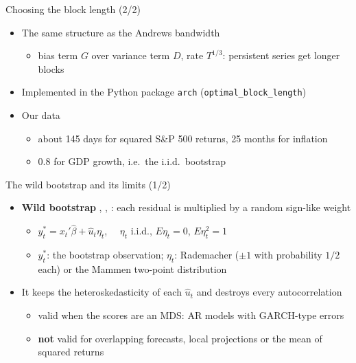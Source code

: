 \begin{frame}{Choosing the block length (2/2)}
\itemsize{\small}
\begin{itemize}
    \item The same structure as the Andrews bandwidth
    \begin{itemize}
        \item bias term $G$ over variance term $D$, rate $T^{1/3}$: persistent series get longer blocks
    \end{itemize}
    \item Implemented in the Python package \texttt{arch} (\texttt{optimal\_block\_length})
    \item Our data
    \begin{itemize}
        \item about 145 days for squared S\&P 500 returns, 25 months for inflation
        \item 0.8 for GDP growth, i.e.\ the i.i.d.\ bootstrap
    \end{itemize}
\end{itemize}
\end{frame}

\begin{frame}{The wild bootstrap and its limits (1/2)}
\itemsize{\small}
\begin{itemize}
    \item \textbf{Wild bootstrap} , , : each residual is multiplied by a random sign-like weight
    \begin{itemize}
        \item $y_t^* = x_t'\hat\beta + \hat u_t\eta_t$, $\quad \eta_t$ i.i.d., $E\eta_t = 0$, $E\eta_t^2 = 1$
        \item $y_t^*$: the bootstrap observation; $\eta_t$: Rademacher ($\pm 1$ with probability $1/2$ each) or the Mammen two-point distribution
    \end{itemize}
    \item It keeps the heteroskedasticity of each $\hat u_t$ and destroys every autocorrelation
    \begin{itemize}
        \item valid when the scores are an MDS: AR models with GARCH-type errors 
        \item \textbf{not} valid for overlapping forecasts, local projections or the mean of squared returns
    \end{itemize}
\end{itemize}
\end{frame}

